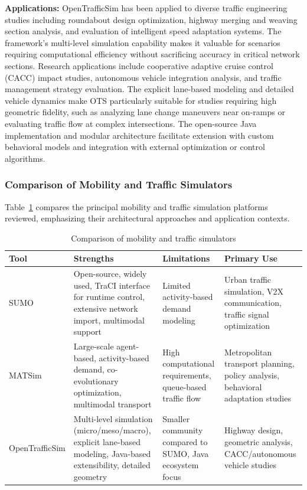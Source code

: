 \textbf{Applications:} OpenTrafficSim has been applied to diverse traffic engineering studies including roundabout design optimization, highway merging and weaving section analysis, and evaluation of intelligent speed adaptation systems. The framework's multi-level simulation capability makes it valuable for scenarios requiring computational efficiency without sacrificing accuracy in critical network sections. Research applications include cooperative adaptive cruise control (CACC) impact studies, autonomous vehicle integration analysis, and traffic management strategy evaluation. The explicit lane-based modeling and detailed vehicle dynamics make OTS particularly suitable for studies requiring high geometric fidelity, such as analyzing lane change maneuvers near on-ramps or evaluating traffic flow at complex intersections. The open-source Java implementation and modular architecture facilitate extension with custom behavioral models and integration with external optimization or control algorithms.

\subsubsection{Comparison of Mobility and Traffic Simulators}

Table~\ref{tab:mobility_comparison} compares the principal mobility and traffic simulation platforms reviewed, emphasizing their architectural approaches and application contexts.

\begin{table}[h]
    \centering
    \caption{Comparison of mobility and traffic simulators}
    \label{tab:mobility_comparison}
    \begin{tabular}{|p{2.5cm}|p{4cm}|p{3.5cm}|p{3.5cm}|}
        \hline
        \textbf{Tool} & \textbf{Strengths} & \textbf{Limitations} & \textbf{Primary Use} \\
        \hline
        SUMO & Open-source, widely used, TraCI interface for runtime control, extensive network import, multimodal support & Limited activity-based demand modeling & Urban traffic simulation, V2X communication, traffic signal optimization \\
        \hline
        MATSim & Large-scale agent-based, activity-based demand, co-evolutionary optimization, multimodal transport & High computational requirements, queue-based traffic flow & Metropolitan transport planning, policy analysis, behavioral adaptation studies \\
        \hline
        OpenTrafficSim & Multi-level simulation (micro/meso/macro), explicit lane-based modeling, Java-based extensibility, detailed geometry & Smaller community compared to SUMO, Java ecosystem focus & Highway design, geometric analysis, CACC/autonomous vehicle studies \\
        \hline
    \end{tabular}
\end{table}


